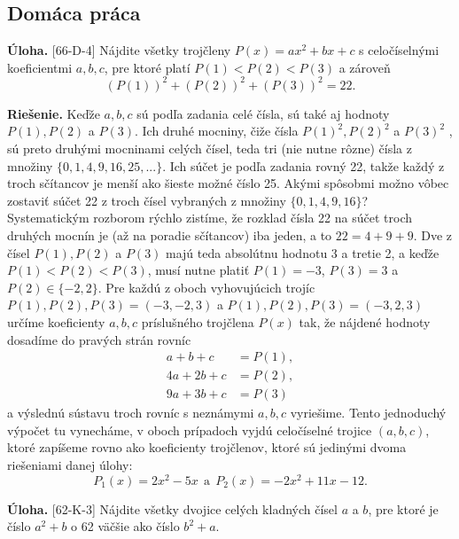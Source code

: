 \documentclass[11pt,a4paper,oneside,final]{book}
\newcommand{\ul}{\textbf{Úloha.} }
\newcommand{\rie}{\textbf{Riešenie.} }
\begin{document}
\subsection*{Domáca práca}
\begin{tcolorbox}[breakable,notitle,boxrule=0pt,colback=light-gray,colframe=light-gray]\ul [66-D-4]
Nájdite všetky trojčleny $P(x)=ax^2+bx+c$ s celočíselnými koeficientmi $a, b, c$, pre ktoré platí $P(1) < P(2) < P(3)$ a zároveň $$(P(1))^2+ (P(2))^2+ (P(3))^2= 22.$$
\end{tcolorbox}

\rie Keďže $a, b, c$ sú podľa zadania celé čísla, sú také aj hodnoty $P(1), P(2)$ a $P(3)$. Ich druhé mocniny, čiže čísla  $P(1)^2 , P(2)^2$ a $P(3)^2$ , sú preto druhými mocninami
celých čísel, teda tri (nie nutne rôzne) čísla z množiny $\{0, 1, 4, 9, 16, 25, . . .\}$. Ich súčet je podľa zadania rovný 22, takže každý z troch sčítancov je menší ako šieste možné číslo 25. Akými spôsobmi možno vôbec zostaviť súčet 22 z troch čísel vybraných z množiny  $\{0, 1, 4, 9, 16\}$?
Systematickým rozborom rýchlo zistíme, že rozklad čísla 22 na súčet troch druhých mocnín je (až na poradie sčítancov) iba jeden, a to $22 = 4+9+9$. Dve z čísel $P(1), P(2)$ a $P(3)$ majú teda absolútnu hodnotu 3 a tretie 2, a keďže
$P(1) < P(2) < P(3)$, musí nutne platiť $P(1) = -3$, $P(3) = 3$ a $P(2) \in \{-2, 2\}$. Pre každú z oboch vyhovujúcich
trojíc $P(1), P(2), P(3) = (-3, -2, 3)$ a $P(1), P(2), P(3) = (-3, 2, 3)$ určíme koeficienty $a, b, c$ príslušného trojčlena $P(x)$ tak, že nájdené hodnoty dosadíme
do pravých strán rovníc
\begin{align*}
a + b + c &= P(1),\\
4a + 2b + c &= P(2),\\
9a + 3b + c &= P(3)
\end{align*}
a výslednú sústavu troch rovníc s neznámymi $a, b, c$ vyriešime. Tento jednoduchý výpočet tu vynecháme, v oboch prípadoch vyjdú celočíselné trojice $(a, b, c)$, ktoré
zapíšeme rovno ako koeficienty trojčlenov, ktoré sú jedinými dvoma riešeniami danej úlohy:
$$P_1(x) = 2x^2 -5x \ \ \text{a} \ \ P_2 (x) = -2x^2+ 11x -12.$$
\begin{tcolorbox}[breakable,notitle,boxrule=0pt,colback=light-gray,colframe=light-gray]\ul [62-K-3]
Nájdite všetky dvojice celých kladných čísel $a$ a $b$, pre ktoré je číslo $a^2 +b$ o 62 väčšie
ako číslo $b^2 + a$.

\end{tcolorbox}
\end{document}
